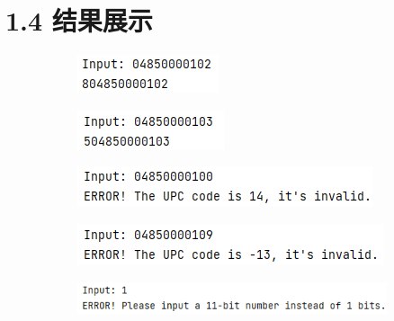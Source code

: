 \section{1.4 结果展示}

\begin{figure}[H]
	\centering
	\begin{subfigure}{0.325\linewidth}
		\centering
		\includegraphics[width=0.7\linewidth]{../pic/1/1.1.png}
	\end{subfigure}
	\begin{subfigure}{0.325\linewidth}
		\centering
		\includegraphics[width=0.7\linewidth]{../pic/1/1.2.png}
	\end{subfigure}
	\begin{subfigure}{0.325\linewidth}
		\centering
		\includegraphics[width=1\linewidth]{../pic/1/1.3.png}
	\end{subfigure}
    \vspace{1cm}
    \begin{subfigure}{0.325\linewidth}
		\centering
		\includegraphics[width=1\linewidth]{../pic/1/1.4.png}
	\end{subfigure}
	\begin{subfigure}{0.325\linewidth}
		\centering
		\includegraphics[width=1\linewidth]{../pic/1/1.5.png}
	\end{subfigure}

\end{figure}

